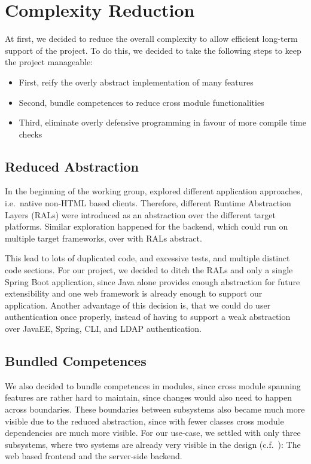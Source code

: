 \section{Complexity Reduction}\label{sec:complexityReduction}
At first, we decided to reduce the overall complexity to allow efficient long-term support of the project.
To do this, we decided to take the following steps to keep the project manageable:
\begin{itemize}
    \item First, reify the overly abstract implementation of many features
    \item Second, bundle competences to reduce cross module functionalities
    \item Third, eliminate overly defensive programming in favour of more compile time checks
\end{itemize}

\subsection*{Reduced Abstraction}
In the beginning of the working group, \citet{maier2015multidevice} explored different application approaches, i.e.\
native non-HTML based clients.
Therefore, different Runtime Abstraction Layers (RALs) were introduced as an abstraction over the different target
platforms.
Similar exploration happened for the backend, which could run on multiple target frameworks, over with RALs abstract.

This lead to lots of duplicated code, and excessive tests, and multiple distinct  code sections.
For our project, we decided to ditch the RALs and only a single Spring Boot application, since Java alone provides
enough abstraction for future extensibility and one web framework is already enough to support our application.
Another advantage of this decision is, that we could do user authentication once properly, instead of having to support
a weak abstraction over JavaEE, Spring, CLI, and LDAP authentication.

\subsection*{Bundled Competences}
We also decided to bundle competences in modules, since cross module spanning features are rather hard to maintain,
since changes would also need to happen across boundaries.
These boundaries between subsystems also became much more visible due to the reduced abstraction, since with fewer
classes cross module dependencies are much more visible.
For our use-case, we settled with only three subsystems, where two systems are already very visible in the design
(c.f.\ \Cref{fig:systemArchitecture}): The web based frontend and the server-side backend.

